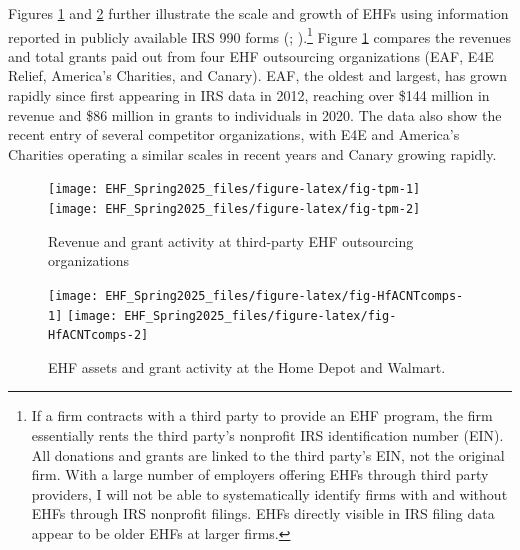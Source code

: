 \documentclass[
  11pt,
  oneside]{article}
\begin{document}
Figures \ref{fig:fig-tpm} and \ref{fig:fig-HfACNTcomps} further illustrate the scale and growth of EHFs using information reported in publicly available IRS 990 forms (; ).\footnote{If a firm contracts with a third party to provide an EHF program, the firm essentially rents the third party's nonprofit IRS identification number (EIN). All donations and grants are linked to the third party's EIN, not the original firm. With a large number of employers offering EHFs through third party providers, I will not be able to systematically identify firms with and without EHFs through IRS nonprofit filings. EHFs directly visible in IRS filing data appear to be older EHFs at larger firms.} Figure \ref{fig:fig-tpm} compares the revenues and total grants paid out from four EHF outsourcing organizations (EAF, E4E Relief, America's Charities, and Canary). EAF, the oldest and largest, has grown rapidly since first appearing in IRS data in 2012, reaching over \$144 million in revenue and \$86 million in grants to individuals in 2020. The data also show the recent entry of several competitor organizations, with E4E and America's Charities operating a similar scales in recent years and Canary growing rapidly.

\begin{figure}
\texttt{[image: EHF\_Spring2025\_files/figure-latex/fig-tpm-1]} \texttt{[image: EHF\_Spring2025\_files/figure-latex/fig-tpm-2]} \caption{Revenue and grant activity at third-party EHF outsourcing organizations}\label{fig:fig-tpm}
\end{figure}

\begin{figure}
\texttt{[image: EHF\_Spring2025\_files/figure-latex/fig-HfACNTcomps-1]} \texttt{[image: EHF\_Spring2025\_files/figure-latex/fig-HfACNTcomps-2]} \caption{EHF assets and grant activity at the Home Depot and Walmart.}\label{fig:fig-HfACNTcomps}
\end{figure}
\end{document}
